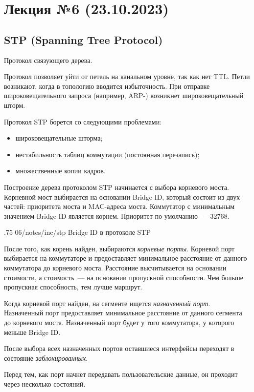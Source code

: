 \section{Лекция №6 (23.10.2023)}

\subsection{STP (Spanning Tree Protocol)}

Протокол связующего дерева.

Протокол позволяет уйти от петель на канальном уровне, так как нет TTL. Петли возникают, когда в топологию вводится избыточность. При отправке широковещательного запроса (например, ARP-) возникнет широковещательный шторм.

Протокол STP борется со следующими проблемами:

\begin{itemize}
    \item широковещательные шторма;
    \item нестабильность таблиц коммутации (постоянная перезапись);
    \item множественные копии кадров.
\end{itemize}

Построение дерева протоколом STP начинается с выбора корневого моста. Корневной мост выбирается на основании Bridge ID, который состоит из двух частей: приоритета моста и MAC-адреса моста. Коммутатор с минимальным значением Bridge ID является корнем. Приоритет по умолчанию~--- \num{32768}.

\image
{.75\textwidth}
{06/notes/inc/stp}
{Bridge ID в протоколе STP}

После того, как корень найден, выбираются \textit{корневые порты}. Корневой порт выбирается на коммутаторе и предоставляет минимальное расстояние от данного коммутатора до корневого моста. Расстояние высчитывается на основании стоимости, а стоимость~--- на основании пропускной способности. Чем больше пропускная способность, тем лучше маршрут.

Когда корневой порт найден, на сегменте ищется \textit{назначенный порт}. Назначенный порт предоставляет минимальное расстояние от данного сегмента до корневого моста. Назначенный порт будет у того коммутатора, у которого меньше Bridge ID.

После выбора всех назначенных портов оставшиеся интерфейсы переходят в состояние \textit{заблокированных}.

Перед тем, как порт начнет передавать пользовательские данные, он проходит через несколько состояний.

